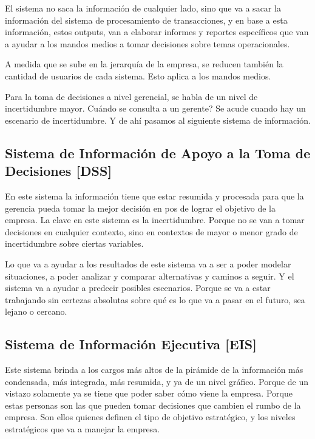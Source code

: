 El sistema no saca la información de cualquier lado, sino que va a sacar
la información del sistema de procesamiento de transacciones, y en base
a esta información, estos outputs, van a elaborar informes y reportes
específicos que van a ayudar a los mandos medios a tomar decisiones
sobre temas operacionales.

A medida que se sube en la jerarquía de la empresa, se reducen también
la cantidad de usuarios de cada sistema. Esto aplica a los mandos
medios.

Para la toma de decisiones a nivel gerencial, se habla de un nivel de
incertidumbre mayor. Cuándo se consulta a un gerente? Se acude cuando
hay un escenario de incertidumbre. Y de ahí pasamos al siguiente sistema
de información.

\hypertarget{sistema-de-informaciuxf3n-de-apoyo-a-la-toma-de-decisiones}{%
\subsection{Sistema de Información de Apoyo a la Toma de
Decisiones [DSS]}\label{sistema-de-informaciuxf3n-de-apoyo-a-la-toma-de-decisiones}}

En este sistema la información tiene que estar resumida y procesada para
que la gerencia pueda tomar la mejor decisión en pos de lograr el
objetivo de la empresa. La clave en este sistema es la incertidumbre.
Porque no se van a tomar decisiones en cualquier contexto, sino en
contextos de mayor o menor grado de incertidumbre sobre ciertas
variables.

Lo que va a ayudar a los resultados de este sistema va a ser a poder
modelar situaciones, a poder analizar y comparar alternativas y caminos
a seguir. Y el sistema va a ayudar a predecir posibles escenarios.
Porque se va a estar trabajando sin certezas absolutas sobre qué es lo
que va a pasar en el futuro, sea lejano o cercano.

\hypertarget{sistema-de-informaciuxf3n-ejecutiva}{%
\subsection{Sistema de Información
Ejecutiva [EIS]}\label{sistema-de-informaciuxf3n-ejecutiva}}

Este sistema brinda a los cargos más altos de la pirámide de la
información más condensada, más integrada, más resumida, y ya de un
nivel gráfico. Porque de un vistazo solamente ya se tiene que poder
saber cómo viene la empresa. Porque estas personas son las que pueden
tomar decisiones que cambien el rumbo de la empresa. Son ellos quienes
definen el tipo de objetivo estratégico, y los niveles estratégicos que
va a manejar la empresa.


